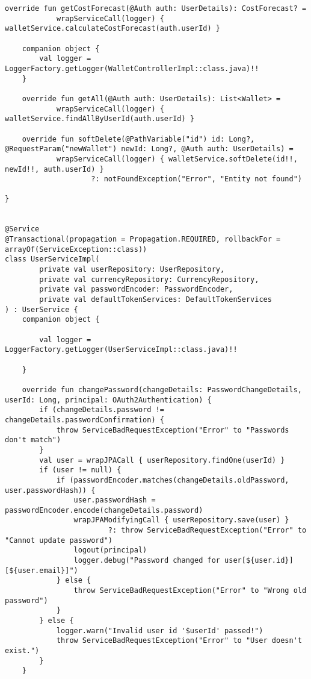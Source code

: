\begin{lstlisting}[style = ktstyle]
    override fun getCostForecast(@Auth auth: UserDetails): CostForecast? =
            wrapServiceCall(logger) { walletService.calculateCostForecast(auth.userId) }

    companion object {
        val logger = LoggerFactory.getLogger(WalletControllerImpl::class.java)!!
    }

    override fun getAll(@Auth auth: UserDetails): List<Wallet> =
            wrapServiceCall(logger) { walletService.findAllByUserId(auth.userId) }

    override fun softDelete(@PathVariable("id") id: Long?, @RequestParam("newWallet") newId: Long?, @Auth auth: UserDetails) =
            wrapServiceCall(logger) { walletService.softDelete(id!!, newId!!, auth.userId) }
                    ?: notFoundException("Error", "Entity not found")

}


@Service
@Transactional(propagation = Propagation.REQUIRED, rollbackFor = arrayOf(ServiceException::class))
class UserServiceImpl(
        private val userRepository: UserRepository,
        private val currencyRepository: CurrencyRepository,
        private val passwordEncoder: PasswordEncoder,
        private val defaultTokenServices: DefaultTokenServices
) : UserService {
    companion object {

        val logger = LoggerFactory.getLogger(UserServiceImpl::class.java)!!

    }

    override fun changePassword(changeDetails: PasswordChangeDetails, userId: Long, principal: OAuth2Authentication) {
        if (changeDetails.password != changeDetails.passwordConfirmation) {
            throw ServiceBadRequestException("Error" to "Passwords don't match")
        }
        val user = wrapJPACall { userRepository.findOne(userId) }
        if (user != null) {
            if (passwordEncoder.matches(changeDetails.oldPassword, user.passwordHash)) {
                user.passwordHash = passwordEncoder.encode(changeDetails.password)
                wrapJPAModifyingCall { userRepository.save(user) }
                        ?: throw ServiceBadRequestException("Error" to "Cannot update password")
                logout(principal)
                logger.debug("Password changed for user[${user.id}][${user.email}]")
            } else {
                throw ServiceBadRequestException("Error" to "Wrong old password")
            }
        } else {
            logger.warn("Invalid user id '$userId' passed!")
            throw ServiceBadRequestException("Error" to "User doesn't exist.")
        }
    }


\end{lstlisting}
